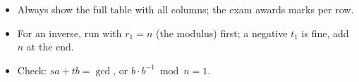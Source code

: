 \begin{examtip}
\begin{itemize}
  \item Always show the full table with all columns; the exam awards marks per row.
  \item For an inverse, run with $r_1 = n$ (the modulus) first; a negative $t_1$ is fine, add $n$ at the end.
  \item Check: $s a + t b = \gcd$, or $b \cdot b^{-1} \bmod n = 1$.
\end{itemize}
\end{examtip}
